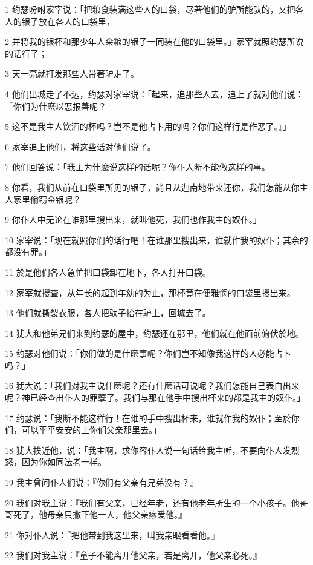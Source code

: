 \par 1 约瑟吩咐家宰说：「把粮食装满这些人的口袋，尽著他们的驴所能驮的，又把各人的银子放在各人的口袋里，
\par 2 并将我的银杯和那少年人籴粮的银子一同装在他的口袋里。」家宰就照约瑟所说的话行了；
\par 3 天一亮就打发那些人带著驴走了。
\par 4 他们出城走了不远，约瑟对家宰说：「起来，追那些人去，追上了就对他们说：『你们为什麽以恶报善呢？
\par 5 这不是我主人饮酒的杯吗？岂不是他占卜用的吗？你们这样行是作恶了。』」
\par 6 家宰追上他们，将这些话对他们说了。
\par 7 他们回答说：「我主为什麽说这样的话呢？你仆人断不能做这样的事。
\par 8 你看，我们从前在口袋里所见的银子，尚且从迦南地带来还你，我们怎能从你主人家里偷窃金银呢？
\par 9 你仆人中无论在谁那里搜出来，就叫他死，我们也作我主的奴仆。」
\par 10 家宰说：「现在就照你们的话行吧！在谁那里搜出来，谁就作我的奴仆；其余的都没有罪。」
\par 11 於是他们各人急忙把口袋卸在地下，各人打开口袋。
\par 12 家宰就搜查，从年长的起到年幼的为止，那杯竟在便雅悯的口袋里搜出来。
\par 13 他们就撕裂衣服，各人把驮子抬在驴上，回城去了。
\par 14 犹大和他弟兄们来到约瑟的屋中，约瑟还在那里，他们就在他面前俯伏於地。
\par 15 约瑟对他们说：「你们做的是什麽事呢？你们岂不知像我这样的人必能占卜吗？」
\par 16 犹大说：「我们对我主说什麽呢？还有什麽话可说呢？我们怎能自己表白出来呢？神已经查出仆人的罪孽了。我们与那在他手中搜出杯来的都是我主的奴仆。」
\par 17 约瑟说：「我断不能这样行！在谁的手中搜出杯来，谁就作我的奴仆；至於你们，可以平平安安的上你们父亲那里去。」
\par 18 犹大挨近他，说：「我主啊，求你容仆人说一句话给我主听，不要向仆人发烈怒，因为你如同法老一样。
\par 19 我主曾问仆人们说：『你们有父亲有兄弟没有？』
\par 20 我们对我主说：『我们有父亲，已经年老，还有他老年所生的一个小孩子。他哥哥死了，他母亲只撇下他一人，他父亲疼爱他。』
\par 21 你对仆人说：『把他带到我这里来，叫我亲眼看看他。』
\par 22 我们对我主说：『童子不能离开他父亲，若是离开，他父亲必死。』
